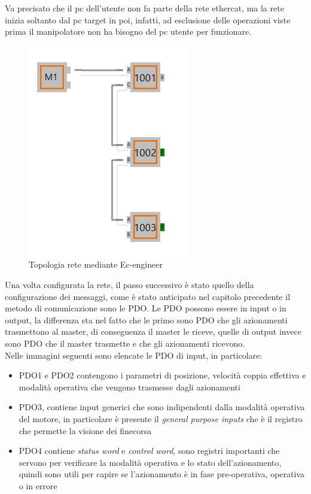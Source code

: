 Va precisato che il pc dell'utente non fa parte della rete ethercat, ma la rete inizia soltanto dal pc target in poi, infatti, ad esclusione delle operazioni viste prima il manipolatore non ha bisogno del pc utente per funzionare.
\begin{figure}[ht]
	\begin{center}
		\includegraphics[scale=0.7]{Immagini/Sperimentale/NetTopology.png}
		\caption{Topologia rete mediante Ec-engineer}
		\label{fig:NetTopology2}
	\end{center}
\end{figure}
Una volta configurata la rete, il passo successivo è stato quello della configurazione dei messaggi, come è stato anticipato nel capitolo precedente il metodo di comunicazione sono le PDO. Le PDO possono essere in input o in output, la differenza sta nel fatto che le primo sono PDO che gli azionamenti trasmettono al master, di conseguenza il master le riceve, quelle di output invece sono PDO che il master trasmette e che gli azionamenti ricevono. 
\\Nelle immagini seguenti sono elencate le PDO di input, in particolare:
\begin{itemize}
 	\item PDO1 e PDO2 contengono i parametri di posizione, velocità coppia effettiva e modalità operativa che vengono trasmesse dagli azionamenti
 	\item PDO3, contiene input generici che sono indipendenti dalla modalità operativa del motore, in particolare è presente il \textit{general purpose inputs} che è il registro che permette la visione dei finecorsa
 	\item PDO4 contiene \textit{status word} e \textit{control word}, sono registri importanti che servono per verificare la modalità operativa e lo stato dell'azionamento, quindi sono utili per capire se l'azionamento è in fase pre-operativa, operativa o in errore
\end{itemize}
